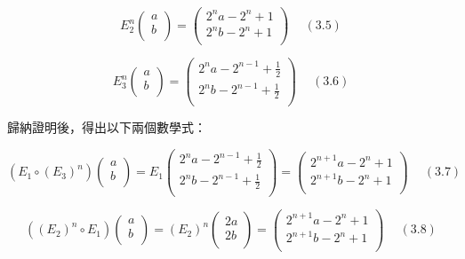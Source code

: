 \documentclass[11pt,UTF8]{ctexart}
\begin{document}
$$E_2^n\left(\begin{matrix}a\\b\\\end{matrix}\right)=\left(\begin{matrix}2^na-2^n+1\\2^nb-2^n+1\\\end{matrix}\right) \quad \ (3.5) $$

$$E_3^n\left(\begin{matrix}a\\b\\\end{matrix}\right)=\left(\begin{matrix}2^na-2^{n-1}+\frac{1}{2}\\2^nb-2^{n-1}+\frac{1}{2}\\\end{matrix}\right) \quad \ (3.6) $$

歸納證明後，得出以下兩個數學式：

$$(E_1 \circ {(E_3)}^n)\left(\begin{matrix}a\\b\\\end{matrix}\right)=E_1\left(\begin{matrix}2^na-2^{n-1}+\frac{1}{2}\\2^nb-2^{n-1}+\frac{1}{2}\\\end{matrix}\right)=\left(\begin{matrix}2^{n+1}a-2^n+ 1 \\2^{n+1}b-2^n+ 1 \\\end{matrix}\right) \quad \ (3.7) $$

$$({(E_2)}^n \circ E_1)\left(\begin{matrix}a\\b\\\end{matrix}\right)={(E_2)}^n\left(\begin{matrix}2a\\2b\\\end{matrix}\right)=\left(\begin{matrix}2^{n+1}a-2^n+1\\2^{n+1}b-2^n+1\\\end{matrix}\right) \quad \ (3.8) $$
\end{document}
